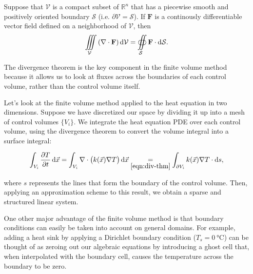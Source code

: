 \begin{thm}
	Suppose that $\mathcal{V}$ is a compact subset of $\mathbb{R}^n$ that has a piecewise smooth and positively oriented boundary $\mathcal{S}$ (i.e. $\partial\mathcal{V}=\mathcal{S}$). If $\mathbf{F}$ is a continously differentiable vector field defined on a neighborhood of $\mathcal{V}$, then
	\begin{equation}
		\iiint\limits_{\mathcal{V}}\left(\nabla\cdot\mathbf{F}\right)\dif\mathcal{V}=\oiint\limits_{\mathcal{S}}\mathbf{F}\cdot\dif\mathcal{S}.\label{eqn:div-thm}
	\end{equation}
	\label{thm:div-thm}
\end{thm}

The divergence theorem is the key component in the finite volume method because it allows us to look at fluxes across the boundaries of each control volume, rather than the control volume itself.

Let's look at the finite volume method applied to the heat equation in two dimensions. Suppose we have discretized our space by dividing it up into a mesh of control volumes $\lbrace V_i\rbrace$. We integrate the heat equation PDE over each control volume, using the divergence theorem to convert the volume integral into a surface integral:

$$\int_{V_i}\frac{\partial T}{\partial t}\dif\vec{x}=\int_{V_i}\nabla\cdot \left(k(\vec{x})\nabla T\right)\dif\vec{x}\underset{\eqref{eqn:div-thm}}{=}\int_{\partial V_i}k(\vec{x})\nabla T\cdot\dif s,$$

where $s$ represents the lines that form the boundary of the control volume. Then, applying an approximation scheme to this result, we obtain a sparse and structured linear system.

One other major advantage of the finite volume method is that boundary conditions can easily be taken into account on general domains. For example, adding a heat sink by applying a Dirichlet boundary condition ($T_s=\SI{0}{\degreeCelsius}$) can be thought of as zeroing out our algebraic equations by introducing a ghost cell that, when interpolated with the boundary cell, causes the temperature across the boundary to be zero.